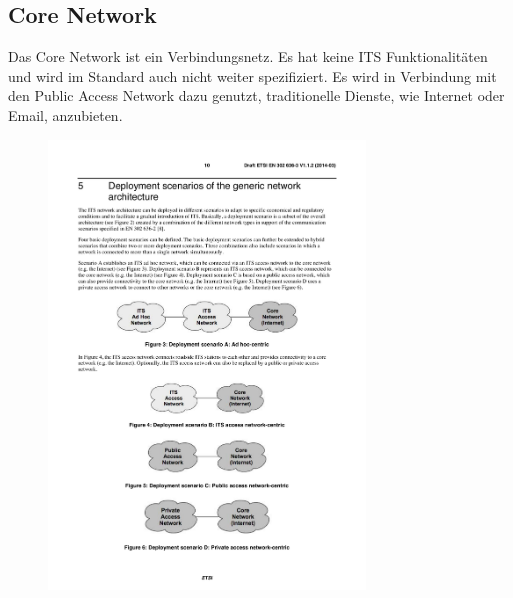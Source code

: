 \subsection{Core Network \label{achitektur_coreNetwork}}
Das Core Network ist ein Verbindungsnetz. Es hat keine \ac{ITS} Funktionalitäten und wird im Standard auch nicht weiter spezifiziert. Es wird in Verbindung mit den Public Access Network dazu genutzt, traditionelle Dienste, wie Internet oder Email, anzubieten.
 
\begin{figure}
	\includegraphics[width=0.75\textwidth]{content/images/02_architektur/netzwerkSzenario.pdf}

\end{figure}
